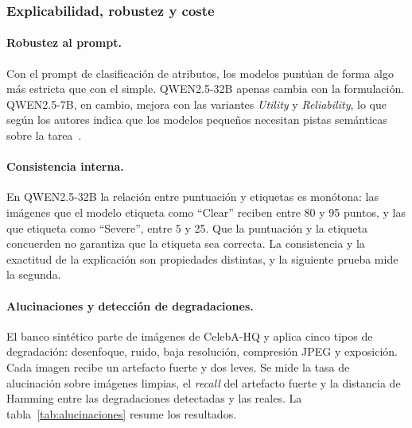 \subsubsection{Explicabilidad, robustez y coste}
\label{sec:explicabilidad}
\paragraph{Robustez al prompt.} Con el prompt de clasificación de atributos, los modelos puntúan de forma algo más estricta que con el simple. QWEN2.5-32B apenas cambia con la formulación. QWEN2.5-7B, en cambio, mejora con las variantes \textit{Utility} y \textit{Reliability}, lo que según los autores indica que los modelos pequeños necesitan pistas semánticas sobre la tarea~\cite{Saritas_2026_FG}.

\paragraph{Consistencia interna.} En QWEN2.5-32B la relación entre puntuación y etiquetas es monótona: las imágenes que el modelo etiqueta como ``Clear'' reciben entre 80 y 95 puntos, y las que etiqueta como ``Severe'', entre 5 y 25. Que la puntuación y la etiqueta concuerden no garantiza que la etiqueta sea correcta. La consistencia y la exactitud de la explicación son propiedades distintas, y la siguiente prueba mide la segunda.

\paragraph{Alucinaciones y detección de degradaciones.} El banco sintético parte de imágenes de CelebA-HQ y aplica cinco tipos de degradación: desenfoque, ruido, baja resolución, compresión JPEG y exposición. Cada imagen recibe un artefacto fuerte y dos leves. Se mide la tasa de alucinación sobre imágenes limpias, el \textit{recall} del artefacto fuerte y la distancia de Hamming entre las degradaciones detectadas y las reales. La tabla~\ref{tab:alucinaciones} resume los resultados.

